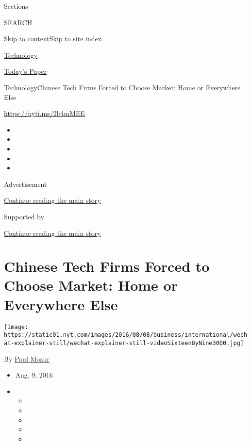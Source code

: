Sections

SEARCH

\protect\hyperlink{site-content}{Skip to
content}\protect\hyperlink{site-index}{Skip to site index}

\href{https://www.nytimes.com/section/technology}{Technology}

\href{https://myaccount.nytimes.com/auth/login?response_type=cookie\&client_id=vi}{}

\href{https://www.nytimes.com/section/todayspaper}{Today's Paper}

\href{/section/technology}{Technology}\textbar{}Chinese Tech Firms
Forced to Choose Market: Home or Everywhere Else

\url{https://nyti.ms/2b4mMEE}

\begin{itemize}
\item
\item
\item
\item
\item
\end{itemize}

Advertisement

\protect\hyperlink{after-top}{Continue reading the main story}

Supported by

\protect\hyperlink{after-sponsor}{Continue reading the main story}

\hypertarget{chinese-tech-firms-forced-to-choose-market-home-or-everywhere-else}{%
\section{Chinese Tech Firms Forced to Choose Market: Home or Everywhere
Else}\label{chinese-tech-firms-forced-to-choose-market-home-or-everywhere-else}}

\texttt{[image: https://static01.nyt.com/images/2016/08/08/business/international/wechat-explainer-still/wechat-explainer-still-videoSixteenByNine3000.jpg]}

By \href{https://www.nytimes.com/by/paul-mozur}{Paul Mozur}

\begin{itemize}
\item
  Aug. 9, 2016
\item
  \begin{itemize}
  \item
  \item
  \item
  \item
  \item
  \end{itemize}
\end{itemize}


